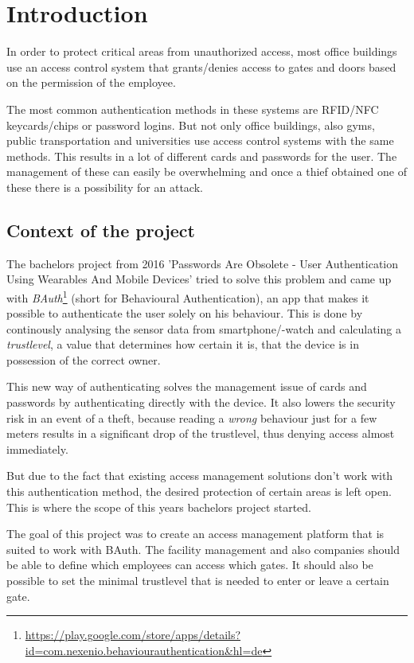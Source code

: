 \chapter{Introduction}

In order to protect critical areas from unauthorized access, most office buildings use an access control system that grants/denies access to gates and doors based on the permission of the employee.

The most common authentication methods in these systems are RFID/NFC keycards/chips or password logins.
But not only office buildings, also gyms, public transportation and universities use access control systems with the same methods. This results in a lot of different cards and passwords for the user. The management of these can easily be overwhelming and once a thief obtained one of these there is a possibility for an attack.

\section{Context of the project}
\label{Context of the project}

The bachelors project from 2016 'Passwords Are Obsolete - User Authentication Using Wearables And Mobile Devices' tried to solve this problem and came up with \emph{BAuth}\footnote{\url{https://play.google.com/store/apps/details?id=com.nexenio.behaviourauthentication&hl=de}} (short for Behavioural Authentication), an app that makes it possible to authenticate the user solely on his behaviour. This is done by continously analysing the sensor data from smartphone/-watch and calculating a \emph{trustlevel}, a value that determines how certain it is, that the device is in possession of the correct owner.

This new way of authenticating solves the management issue of cards and passwords by authenticating directly with the device. It also lowers the security risk in an event of a theft, because reading a \emph{wrong} behaviour just for a few meters results in a significant drop of the trustlevel, thus denying access almost immediately.

But due to the fact that existing access management solutions don't work with this authentication method, the desired protection of certain areas is left open. This is where the scope of this years bachelors project started. 

The goal of this project was to create an access management platform that is suited to work with BAuth. The facility management and also companies should be able to define which employees can access which gates. It should also be possible to set the minimal trustlevel that is needed to enter or leave a certain gate.


